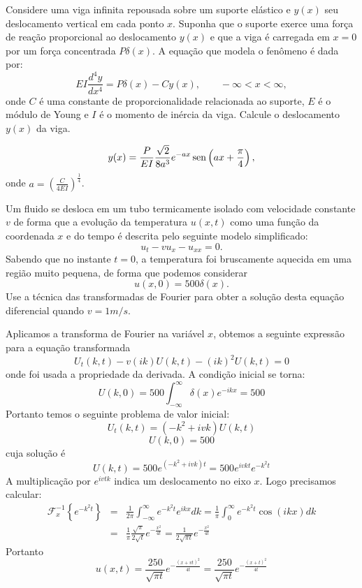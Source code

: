 \begin{Exercise} Considere uma viga infinita repousada sobre um suporte elástico e $y(x)$ seu deslocamento vertical em cada ponto $x$. Suponha que o suporte exerce uma força de reação proporcional ao deslocamento $y(x)$ e que a viga é carregada em $x=0$ por um força concentrada $P\delta(x)$. A equação que modela o fenômeno é dada por:
$$
EI\frac{d^4 y}{dx^4}=P\delta(x)-Cy(x),\qquad -\infty<x<\infty,
$$
onde $C$ é uma constante de proporcionalidade relacionada ao suporte, $E$ é o módulo de Young e $I$ é o momento de inércia da viga. Calcule o deslocamento $y(x)$ da viga.
\end{Exercise}
\begin{Answer}
\begin{eqnarray*}
y(x)=\frac{P}{EI}\frac{\sqrt{2}}{8a^3}e^{-ax}\operatorname{sen}\left(ax+\frac{\pi}{4}\right),
\end{eqnarray*}
onde $a=\left(\frac{C}{4EI}\right)^{\frac{1}{4}}$.
\end{Answer}


\begin{Exercise}
Um fluido se desloca em um tubo termicamente isolado com velocidade constante $v$ de forma que a evolução da temperatura $u(x,t)$ como uma função da coordenada $x$ e do tempo é descrita pelo seguinte modelo simplificado:
$$u_t-vu_x-u_{xx}=0.$$
Sabendo que no instante $t=0$, a temperatura foi bruscamente aquecida em uma região muito pequena, de forma que podemos considerar
$$u(x,0)=500 \delta(x).$$ 
Use a técnica das transformadas de Fourier para obter a solução desta equação diferencial quando $v=1m/s$.
\end{Exercise}
\begin{Answer}
Aplicamos a transforma de Fourier na variável $x$, obtemos a seguinte expressão para a equação transformada
$$U_t(k,t)-v(ik)U(k,t)-(ik)^2U(k,t)=0$$
onde foi usada a propriedade da derivada.
A condição inicial se torna:
$$U(k,0)=500\int_{-\infty}^\infty \delta(x)e^{-ikx}=500$$
Portanto temos o seguinte problema de valor inicial:
$$U_t(k,t)=(-k^2+ivk)U(k,t)$$
$$U(k,0)=500$$
cuja solução é
$$U(k,t)=500e^{(-k^2+ivk)t}=500 e^{ivkt}e^{-k^2t}$$
A multiplicação por $e^{ivtk}$ indica um deslocamento no eixo $x$. Logo precisamos calcular:
\begin{eqnarray*}
\mathcal{F}^{-1}_x\left\{e^{-k^2t}\right\}&=&\frac{1}{2\pi}\int_{-\infty}^\infty e^{-k^2t} e^{ikx}dk=\frac{1}{\pi}\int_{0}^\infty e^{-k^2t} \cos({ikx})dk\\
&=&\frac{1}{\pi}\frac{\sqrt{\pi}}{2\sqrt{t}}e^{-\frac{x^2}{4t}}=\frac{1}{2\sqrt{\pi t}}e^{-\frac{x^2}{4t}}
\end{eqnarray*}
Portanto
$$u(x,t)=\frac{250}{\sqrt{\pi t}}e^{-\frac{(x+vt)^2}{4t}}=\frac{250}{\sqrt{\pi t}}e^{-\frac{(x+t)^2}{4t}}$$

\end{Answer}
%